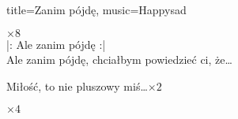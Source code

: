 \begin{song}{title={Zanim pójdę}, music={Happysad}}
\begin{chorus}
    \end{chorus}
    \begin{interlude}
           $\times 8$ \medskip \\
        |: Ale zanim pójdę :| \\
        Ale zanim pójdę, chciałbym powiedzieć ci, że\ldots
    \end{interlude}
    \begin{chorus}
        Miłość, to nie pluszowy miś\ldots$\times 2$
    \end{chorus}
    \begin{chorus*}
           $\times 4$ \\
    \end{chorus*}
\end{song}

